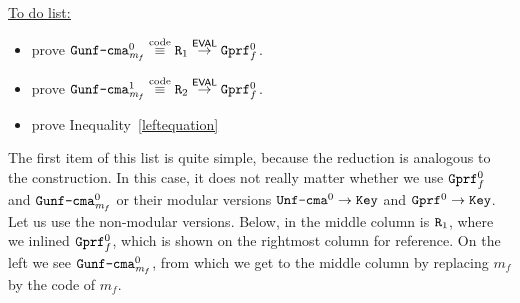 \documentclass[a4paper,table,dvipsnames]{article}
\theoremstyle{definition}
\newcommand{\M}[1]{\ensuremath{\text{\texttt{#1}}}}
\renewcommand{\O}[1]{\ensuremath{\mathsf{#1}}}
\newcommand{\pcvar}[1]{\ensuremath{\mathit{#1}}}
\newcommand{\m}{\pcvar{m}} %
\begin{document}
	\underline{\underline{To do list:}}
	\begin{itemize}
	\item prove $\M{Gunf\text{-}cma}_{\m_f}^0\stackrel{\text{code}}{\equiv}\M{R}_1\stackrel{\O{EVAL}}{\rightarrow}\M{Gprf}^0_f$.
	\item prove $\M{Gunf\text{-}cma}_{\m_f}^1\stackrel{\text{code}}{\equiv}\M{R}_2\stackrel{\O{EVAL}}{\rightarrow}\M{Gprf}^0_f$.
	\item prove Inequality~\ref{leftequation}
	\end{itemize}
The first item of this list is quite simple, because the reduction is analogous to the construction. In this case, it does not really matter whether we use $\M{Gprf}^0_f$ and $\M{Gunf\text{-}cma}_{\m_f}^0$ or their modular versions $\M{Unf\text{-}cma}^0\rightarrow\M{Key}$ and $\M{Gprf}^0\rightarrow\M{Key}$. Let us use the non-modular versions.
Below, in the middle column is $\M{R}_1$, where we inlined $\M{Gprf}^0_f$, which is shown on the rightmost column for reference. On the left we see $\M{Gunf\text{-}cma}_{\m_f}^0$, from which we get to the middle column by replacing $\m_f$ by the code of $\m_f$.
\end{document}
